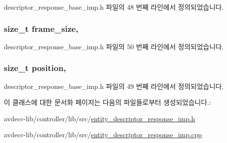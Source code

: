 descriptor\+\_\+response\+\_\+base\+\_\+imp.\+h 파일의 48 번째 라인에서 정의되었습니다.

\subsubsection[{\texorpdfstring{frame\+\_\+size}{frame_size}}]{\setlength{\rightskip}{0pt plus 5cm}size\+\_\+t frame\+\_\+size\hspace{0.3cm}{\ttfamily [protected]}, {\ttfamily [inherited]}}\hypertarget{classavdecc__lib_1_1descriptor__response__base__imp_affd041a595cabab98275245b9cb2824d}{}\label{classavdecc__lib_1_1descriptor__response__base__imp_affd041a595cabab98275245b9cb2824d}


descriptor\+\_\+response\+\_\+base\+\_\+imp.\+h 파일의 50 번째 라인에서 정의되었습니다.

\subsubsection[{\texorpdfstring{position}{position}}]{\setlength{\rightskip}{0pt plus 5cm}size\+\_\+t position\hspace{0.3cm}{\ttfamily [protected]}, {\ttfamily [inherited]}}\hypertarget{classavdecc__lib_1_1descriptor__response__base__imp_a7a04afe5347934be732ec70a70bd0a28}{}\label{classavdecc__lib_1_1descriptor__response__base__imp_a7a04afe5347934be732ec70a70bd0a28}


descriptor\+\_\+response\+\_\+base\+\_\+imp.\+h 파일의 49 번째 라인에서 정의되었습니다.



이 클래스에 대한 문서화 페이지는 다음의 파일들로부터 생성되었습니다.\+:\begin{DoxyCompactItemize}
\item 
avdecc-\/lib/controller/lib/src/\hyperlink{entity__descriptor__response__imp_8h}{entity\+\_\+descriptor\+\_\+response\+\_\+imp.\+h}\item 
avdecc-\/lib/controller/lib/src/\hyperlink{entity__descriptor__response__imp_8cpp}{entity\+\_\+descriptor\+\_\+response\+\_\+imp.\+cpp}\end{DoxyCompactItemize}
